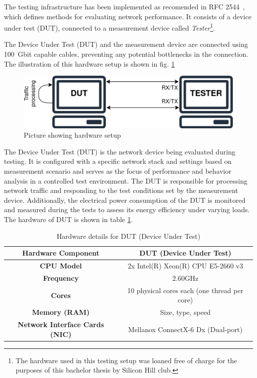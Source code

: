 The testing infrastructure has been implemented as recomended in RFC 2544~\cite{rfc2544}, which defines methods for evaluating network performance. 
It consists of a device under test (DUT), connected to a measurement device called \textit{Tester}\footnote{The hardware used in this testing setup was loaned free of charge for the purposes of this bachelor thesis by Silicon Hill club.}.

The Device Under Test (DUT) and the measurement device are connected using 100~Gbit capable cables, preventing any potential bottlenecks in the connection.
The illustration of this hardware setup is shown in fig. \ref{fig:hardware-setup}

\begin{figure}[!htbp]
    \centering
    \includegraphics[width=0.9\linewidth]{images/setup.png}
    \caption{Picture showing hardware setup}
    \label{fig:hardware-setup}
\end{figure}

The Device Under Test (DUT) is the network device being evaluated during testing. 
It is configured with a specific network stack and settings based on measurement scenario 
and serves as the focus of performance and behavior analysis in a controlled test environment. 
The DUT is responsible for processing network traffic and responding to the test conditions set by the measurement device.
Additionally, the electrical power consumption of the DUT is monitored and measured during the tests to assess its energy efficiency under varying loads.
The hardware of DUT is shown in table \ref{tab:hardware_dut}.

\begin{table}[h!]
\centering
\caption{Hardware details for DUT (Device Under Test)}
\begin{tabular}{|c|c|}
\hline
\textbf{Hardware Component} & \textbf{DUT (Device Under Test)} \\
\hline
\textbf{CPU Model} & 2x Intel(R) Xeon(R) CPU E5-2660 v3 \\
\hline
\textbf{Frequency} & 2.60GHz \\
\hline
\textbf{Cores} & 10 physical cores each (one thread per core) \\
\hline
\textbf{Memory (RAM)} & Size, type, speed \\
\hline
\textbf{Network Interface Cards (NIC)} & Mellanox ConnectX-6 Dx (Dual-port) \\
\hline
\end{tabular}
\label{tab:hardware_dut}
\end{table}

